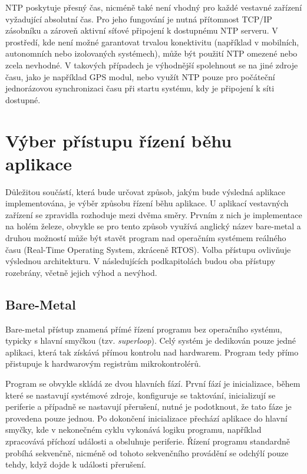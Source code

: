 NTP poskytuje přesný čas, nicméně také není vhodný pro každé vestavné zařízení vyžadující absolutní čas. Pro jeho fungování je nutná přítomnost TCP/IP zásobníku a zároveň aktivní síťové připojení k dostupnému NTP serveru. V prostředí, kde není možné garantovat trvalou konektivitu (například v mobilních, autonomních nebo izolovaných systémech), může být použití NTP omezené nebo zcela nevhodné. V takových případech je výhodnější spolehnout se na jiné zdroje času, jako je například GPS modul, nebo využít NTP pouze pro počáteční jednorázovou synchronizaci času při startu systému, kdy je připojení k síti dostupné.

\section{Výber přístupu řízení běhu aplikace}
Důležitou součástí, která bude určovat způsob, jakým bude výsledná aplikace implementována, je výběr způsobu řízení běhu aplikace. U aplikací vestavných zařízení se zpravidla rozhoduje mezi dvěma směry. Prvním z nich je implementace na holém železe, obvykle se pro tento způsob využívá anglický název bare-metal a druhou možností může být stavět program nad operačním systémem reálného času (Real-Time Operating System, zkráceně RTOS). Volba přístupu ovlivňuje výslednou architekturu. V následujících podkapitolách budou oba přístupy rozebrány, včetně jejich výhod a nevýhod. 


\subsection{Bare-Metal}
Bare-metal přístup znamená přímé řízení programu bez operačního systému, typicky s hlavní smyčkou (tzv. \emph{superloop}). Celý systém je dedikován pouze jedné aplikaci, která tak získává přímou kontrolu nad hardwarem. Program tedy přímo přistupuje k hardwarovým registrům mikrokontrolérů. 

Program se obvykle skládá ze dvou hlavních fází. První fází je inicializace, během které se nastavují systémové zdroje, konfiguruje se taktování, inicializují se periferie a případně se nastavují přerušení, nutné je podotknout, že tato fáze je provedena pouze jednou. Po dokončení inicializace přechází aplikace do hlavní smyčky, kde v nekonečném cyklu vykonává logiku programu, například zpracovává příchozí události a obsluhuje periferie. Řízení programu standardně probíhá sekvenčně, nicméně od tohoto sekvenčního provádění se odchýlí pouze tehdy, když dojde k události přerušení.

